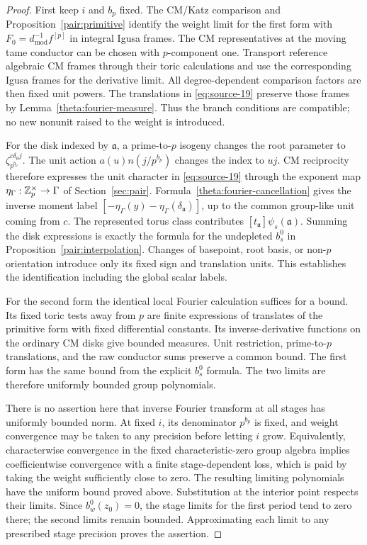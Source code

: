 \begin{proof}
First keep $i$ and $b_p$ fixed.  The CM/Katz comparison and
Proposition~\ref{pair:primitive} identify the weight limit for the
first form with $F_0=d_{\mathrm{mod}}^{-1}f^{[p]}$ in integral
Igusa frames.  The CM representatives at the moving tame conductor
can be chosen with $p$-component one.  Transport reference algebraic
CM frames through their toric calculations and use the corresponding
Igusa frames for the derivative limit.  All degree-dependent
comparison factors are then fixed unit powers.  The translations
in \eqref{eq:source-19} preserve those frames by
Lemma~\ref{theta:fourier-measure}.  Thus the branch conditions are
compatible; no new nonunit raised to the weight is introduced.

For the disk indexed by $\mathfrak a$, a prime-to-$p$ isogeny
changes the root parameter to $\zeta_{p^{b_p}}^{c\delta_{\mathfrak a}j}$.
The unit action $a(u)n(j/p^{b_p})$ changes the index to $uj$.
CM reciprocity therefore expresses the unit character in
\eqref{eq:source-19} through the exponent map
$\eta_\Gamma:\mathbb Z_p^\times\to\Gamma$ of Section~\ref{sec:pair}.
Formula~\eqref{theta:fourier-cancellation} gives the inverse moment
label
$[-\eta_\Gamma(y)-\eta_\Gamma(\delta_{\mathfrak a})]$, up to the common group-like
unit coming from $c$.  The represented torus class contributes
$[t_{\mathfrak a}]\psi_s(\mathfrak a)$.  Summing the disk expressions
is exactly the formula for the undepleted $b_s^0$ in
Proposition~\ref{pair:interpolation}.  Changes of basepoint, root
basis, or non-$p$ orientation introduce only its fixed sign and
translation units.  This establishes the identification including
the global scalar labels.

For the second form the identical local Fourier calculation suffices
for a bound.  Its fixed toric tests away from $p$ are finite
expressions of translates of the primitive form with fixed
differential constants.  Its inverse-derivative functions on the
ordinary CM disks give bounded measures.  Unit restriction,
prime-to-$p$ translations, and the raw conductor sums preserve a
common bound.  The first form has the same bound from the explicit
$b_s^0$ formula.  The two limits are therefore uniformly bounded
group polynomials.

There is no assertion here that inverse Fourier transform at all
stages has uniformly bounded norm.  At fixed $i$, its denominator
$p^{b_p}$ is fixed, and weight convergence may be taken to any
precision before letting $i$ grow.  Equivalently, characterwise
convergence in the fixed characteristic-zero group algebra implies
coefficientwise convergence with a finite stage-dependent loss,
which is paid by taking the weight sufficiently close to zero.
The resulting limiting polynomials have the uniform bound proved
above.  Substitution at the interior point respects their limits.
Since $b_w^0(z_0)=0$, the stage limits for the first period tend to
zero there; the second limits remain bounded.  Approximating each
limit to any prescribed stage precision proves the assertion.
\end{proof}

